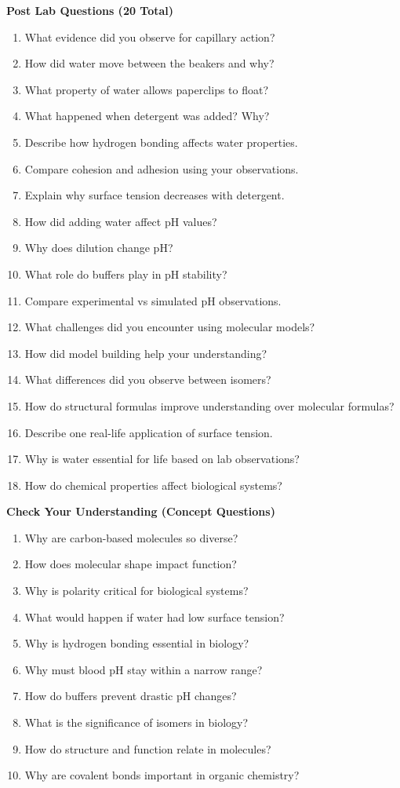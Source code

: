 \documentclass[
  letterpaper,
  DIV=11,
  numbers=noendperiod]{scrreprt}
\begin{document}
\textbf{Post Lab Questions (20 Total)}

\begin{enumerate}
\def\labelenumi{\arabic{enumi}.}
\item
  What evidence did you observe for capillary action?
\item
  How did water move between the beakers and why?
\item
  What property of water allows paperclips to float?
\item
  What happened when detergent was added? Why?
\item
  Describe how hydrogen bonding affects water properties.
\item
  Compare cohesion and adhesion using your observations.
\item
  Explain why surface tension decreases with detergent.
\item
  How did adding water affect pH values?
\item
  Why does dilution change pH?
\item
  What role do buffers play in pH stability?
\item
  Compare experimental vs simulated pH observations.
\item
  What challenges did you encounter using molecular models?
\item
  How did model building help your understanding?
\item
  What differences did you observe between isomers?
\item
  How do structural formulas improve understanding over molecular
  formulas?
\item
  Describe one real-life application of surface tension.
\item
  Why is water essential for life based on lab observations?
\item
  How do chemical properties affect biological systems?
\end{enumerate}

\textbf{Check Your Understanding (Concept Questions)}

\begin{enumerate}
\def\labelenumi{\arabic{enumi}.}
\item
  Why are carbon-based molecules so diverse?
\item
  How does molecular shape impact function?
\item
  Why is polarity critical for biological systems?
\item
  What would happen if water had low surface tension?
\item
  Why is hydrogen bonding essential in biology?
\item
  Why must blood pH stay within a narrow range?
\item
  How do buffers prevent drastic pH changes?
\item
  What is the significance of isomers in biology?
\item
  How do structure and function relate in molecules?
\item
  Why are covalent bonds important in organic chemistry?
\end{enumerate}
\end{document}
